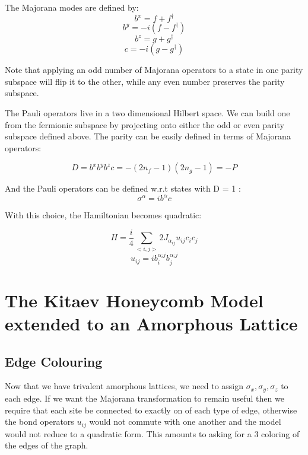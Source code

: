The Majorana modes are defined by:
\[b^x = f + f^\dagger\]
\[b^y = -i(f - f^\dagger)\]
\[b^z = g + g^\dagger\]
\[c = -i(g - g^\dagger)\]

Note that applying an odd number of Majorana operators to a state in one parity subspace will flip it to the other, while any even number preserves the parity subspace. 

The Pauli operators live in a two dimensional Hilbert space. We can build one from the fermionic subspace by projecting onto either the odd or even parity subspace defined above. The parity can be easily defined in terms of Majorana operators:

\[D = b^x b^y b^z c = - (2n_f - 1)(2n_g - 1) = - P\]

And the Pauli operators can be defined w.r.t states with D = 1 :
\[\sigma^\alpha = i b^\alpha c\]

With this choice, the Hamiltonian becomes quadratic:

\[H = \frac{i}{4} \sum_{<i,j>} 2 J_{\alpha_{ij}} u_{ij} c_i c_j\]
\[u_{ij} = i b^{\alpha_ij}_i b^{\alpha_ij}_j\]



\section{The Kitaev Honeycomb Model extended to an Amorphous Lattice}




\subsection{Edge Colouring}


Now that we have trivalent amorphous lattices, we need to assign \(\sigma_x, \sigma_y, \sigma_z\) to each edge. If we want the Majorana transformation to remain useful then we require that each site be connected to exactly on of each type of edge, otherwise the bond operators \(u_{ij}\) would not commute with one another and the model would not reduce to a quadratic form. This amounts to asking for a 3 coloring of the edges of the graph. 

